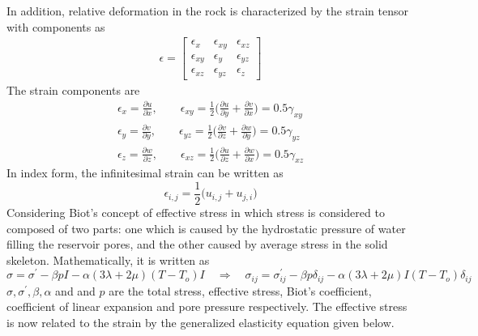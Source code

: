 \documentclass[12pt]{article}
\begin{document}
%
In addition, relative deformation in the rock is characterized by the strain tensor with components as
\newline
\begin{gather}				\label{eq7}
\epsilon = \left[
\begin{array}{ccc}
\epsilon_x & \epsilon_{xy} & \epsilon_{xz} 	\\
\epsilon_{xy} & \epsilon_y & \epsilon_{yz}		\\
\epsilon_{xz} & \epsilon_{yz} & \epsilon_z
\end{array}
\right]
\end{gather}
\newline
The strain components are
%
 \begin{equation}			\label{eq8}		
 \begin{split}
\epsilon_x = \frac{\partial u}{\partial x}, \qquad	\epsilon_{xy}=\frac{1}{2}\big(\frac{\partial u}{\partial y}+\frac{\partial v}{\partial x}\big)=0.5\gamma_{xy}	\\
\epsilon_y = \frac{\partial v}{\partial y}, \qquad	\epsilon_{yz}=\frac{1}{2}\big(\frac{\partial v}{\partial z}+\frac{\partial w}{\partial y}\big)=0.5\gamma_{yz}	\\
%
\epsilon_z = \frac{\partial w}{\partial z}, \qquad	\epsilon_{xz}=\frac{1}{2}\big(\frac{\partial u}{\partial z}+\frac{\partial w}{\partial x}\big)	=0.5\gamma_{xz}
\end{split}
\end{equation}
%
In index form, the infinitesimal strain can be written as
%
\begin{equation}		\label{eq9}
\epsilon_{i,j} = \frac{1}{2}\Big(u_{i,j}+u_{j,i}\Big)
\end{equation}
%
Considering Biot's concept of effective stress in which stress is considered to composed of two parts: one which is caused by the hydrostatic pressure of water filling the reservoir pores, and the other caused by average stress in the solid skeleton. Mathematically, it is written as
%
\begin{equation}		\label{eq10}
\sigma = \sigma^{\prime} -\beta pI -\alpha(3\lambda+2\mu)(T-T_o)I\quad \Rightarrow \quad \sigma_{ij}=\sigma^{\prime}_{ij}-\beta  p \delta_{ij}-\alpha(3\lambda+2\mu)I(T-T_o)\delta_{ij}
\end{equation}
$\sigma, \sigma^{\prime},\beta, \alpha$ and and $p$ are the total stress, effective stress, Biot's coefficient, coefficient of linear expansion and pore pressure respectively. 
%
The effective stress is now related to the strain by the generalized elasticity equation given below.
\end{document}
